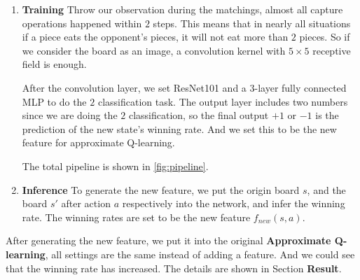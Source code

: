 \begin{enumerate}
    \item \textbf{Training}
    Throw our observation during the matchings, almost all capture operations happened within $2$ steps. This means that in nearly all situations if a piece eats the opponent's pieces, it will not eat more than $2$ pieces. So if we consider the board as an image, a convolution kernel with $5\times 5$ receptive field is enough.

    After the convolution layer, we set ResNet101 and a $3$-layer fully connected MLP to do the $ 2$ classification task. The output layer includes two numbers since we are doing the $ 2$ classification, so the final output $+1$ or $-1$ is the prediction of the new state's winning rate. And we set this to be the new feature for approximate Q-learning.
    
    The total pipeline is shown in \ref{fig:pipeline}.
    
    \item \textbf{Inference} To generate the new feature, we put the origin board $s$, and the board $s'$ after action $a$ respectively into the network, and infer the winning rate. The winning rates are set to be the new feature $f_{new}(s,a)$.

\end{enumerate}

After generating the new feature, we put it into the original \textbf{Approximate Q-learning}, all settings are the same instead of adding a feature. And we could see that the winning rate has increased. The details are shown in Section \textbf{Result}.